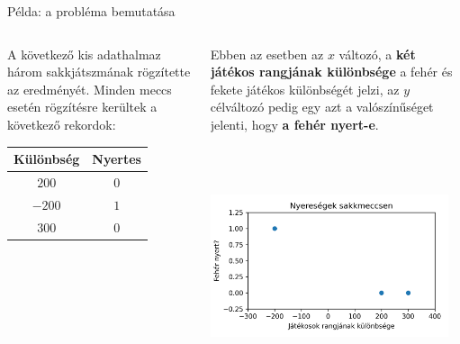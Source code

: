 \documentclass[english, aspectratio=169]{beamer}
\begin{document}
\begin{frame}{Példa: a probléma bemutatása}
\begin{columns}
\begin{column}{.5\textwidth}
A következő kis adathalmaz három sakkjátszmának rögzítette az eredményét. Minden meccs esetén rögzítésre kerültek a következő rekordok:\par\medskip
\begin{center}
\begin{tabular}{|c|c|}
\hline
Különbség & Nyertes\\
\hline
$200$ & $0$\\
\hline
$-200$ & $1$\\
\hline
$300$ & $0$\\
\hline
\end{tabular}
\end{center}
\end{column}
\begin{column}{.5\textwidth}
Ebben az esetben az $x$ változó, a \textbf{két játékos rangjának különbsége} a fehér és fekete játékos különbségét jelzi, az $y$ célváltozó pedig egy azt a valószínűséget jelenti, hogy \textbf{a fehér nyert-e}.
\begin{center}
\includegraphics[width=7cm, height=7cm, keepaspectratio]{images/osztalyozas_12.png}
\end{center}
\end{column}
\end{columns}
\end{frame}
\end{document}
